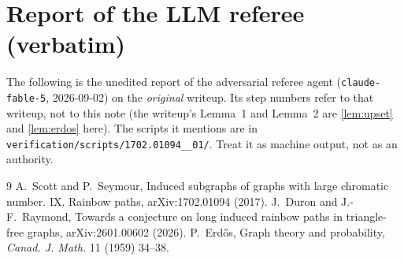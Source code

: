 \documentclass[11pt,a4paper]{article}
\theoremstyle{plain}
\theoremstyle{definition}
\theoremstyle{remark}
\begin{document}
\section{Report of the LLM referee (verbatim)}\label{app:referee}

\begin{tcolorbox}[colback=gray!8,colframe=gray!50,boxrule=0.4pt,arc=2pt]
\small The following is the unedited report of the adversarial referee agent (\texttt{claude-fable-5}, 2026-09-02) on the \emph{original} writeup. Its step numbers refer to that writeup, not to this note (the writeup's Lemma~1 and Lemma~2 are \cref{lem:upset} and \cref{lem:erdos} here). The scripts it mentions are in \texttt{verification/scripts/1702.01094\_\_01/}. Treat it as machine output, not as an authority.
\end{tcolorbox}



\begin{thebibliography}{9}
 A.~Scott and P.~Seymour, Induced subgraphs of graphs with large chromatic number. IX. Rainbow paths, arXiv:1702.01094 (2017).
 J.~Duron and J.-F.~Raymond, Towards a conjecture on long induced rainbow paths in triangle-free graphs, arXiv:2601.00602 (2026).
 P.~Erdős, Graph theory and probability, \emph{Canad. J. Math.} 11 (1959) 34--38.
\end{thebibliography}
\end{document}
